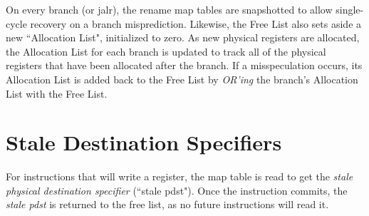 On every branch (or jalr), the rename map tables are snapshotted to allow single-cycle recovery on a branch misprediction. Likewise, the Free List also sets aside a new ``Allocation List", initialized to zero.  As new physical registers are allocated, the Allocation List for each branch is updated to track all of the physical registers that have been allocated after the branch. If a misspeculation occurs, its Allocation List is added back to the Free List by {\em OR'ing} the branch's Allocation List with the Free List. 

\section{Stale Destination Specifiers}

For instructions that will write a register, the map table is read to get the {\em stale physical destination specifier} (``stale pdst").  Once the instruction commits, the {\em stale pdst} is returned to the free list, as no future instructions will read it.

%



